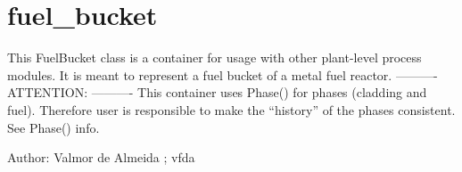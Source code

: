 \documentclass[letterpaper,10pt,openany,oneside,english]{sphinxmanual}
\begin{document}
\section{fuel\_bucket}
\label{\detokenize{support_rst/fuel_bucket:module-fuel_bucket}}\label{\detokenize{support_rst/fuel_bucket:fuel-bucket}}\label{\detokenize{support_rst/fuel_bucket::doc}}
This FuelBucket class is a container for usage with other plant-level process modules.
It is meant to represent a fuel bucket of a metal fuel reactor.
———-
ATTENTION:
———-
This container uses Phase() for phases (cladding and fuel). Therefore user is
responsible to make the “history” of the phases consistent. See Phase() info.

Author: Valmor de Almeida ; vfda
\end{document}
